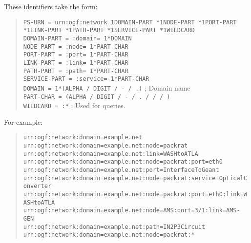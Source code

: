 \documentclass[12pt]{article}  %
\begin{document}
These identifiers take the form:
\begin{quote}
  \texttt{PS-URN = \qq{}urn:ogf:network\qq{} 1DOMAIN-PART *1NODE-PART *1PORT-PART } \\
  \hspace*{2cm}\texttt{*1LINK-PART *1PATH-PART *1SERVICE-PART *1WILDCARD } \\
  \texttt{DOMAIN-PART  = \qq{}:domain=\qq{} 1*DOMAIN} \\
  \texttt{NODE-PART    = \qq{}:node=\qq{} 1*PART-CHAR} \\
  \texttt{PORT-PART    = \qq{}:port=\qq{} 1*PART-CHAR} \\
  \texttt{LINK-PART    = \qq{}:link=\qq{} 1*PART-CHAR} \\
  \texttt{PATH-PART    = \qq{}:path=\qq{} 1*PART-CHAR} \\
  \texttt{SERVICE-PART = \qq{}:service=\qq{} 1*PART-CHAR} \\
  \texttt{DOMAIN = 1*(ALPHA / DIGIT / \qq{}-\qq{} / \qq{}.\qq{})} ; Domain name \\
  \texttt{PART-CHAR = (ALPHA / DIGIT / \qq{}-\qq{} / \qq{}.\qq{} / \qq{}/\qq{} / \qq{}\underscore\qq{})} \\
  \texttt{WILDCARD = \qq{}:*\qq{}} ; Used for queries.
\end{quote}

For example:

\begin{quote}
\texttt{urn:ogf:network:domain=example.net} \\
\texttt{urn:ogf:network:domain=example.net:node=packrat} \\
\texttt{urn:ogf:network:domain=example.net:link=WASH\underscore{}to\underscore{}ATLA} \\
\texttt{urn:ogf:network:domain=example.net:node=packrat:port=eth0} \\
\texttt{urn:ogf:network:domain=example.net:port=Interface\underscore{}To\underscore{}Geant} \\
\texttt{urn:ogf:network:domain=example.net:node=packrat:service=Optical\underscore{}Converter} \\
\texttt{urn:ogf:network:domain=example.net:node=packrat:port=eth0:link=WASH\underscore{}to\underscore{}ATLA} \\
\texttt{urn:ogf:network:domain=example.net:node=AMS:port=3/1:link=AMS-GEN} \\
\texttt{urn:ogf:network:domain=example.net:path=IN2P3\underscore{}Circuit} \\
\texttt{urn:ogf:network:domain=example.net:node=packrat:*}
\end{quote}
\end{document}
